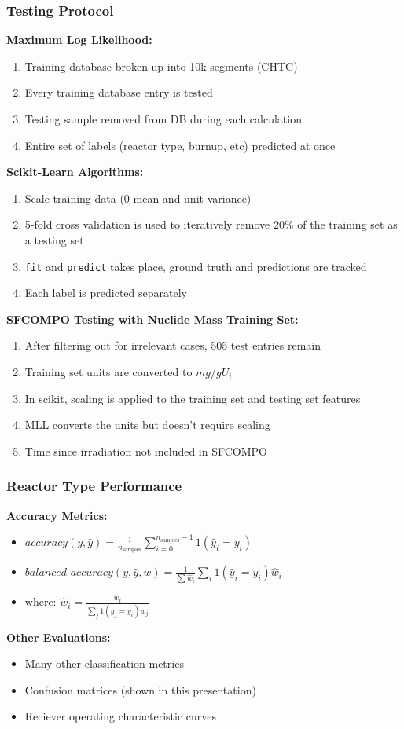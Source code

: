 
\begin{frame}
  \frametitle{Testing Protocol}
  \textbf{Maximum Log Likelihood:}
  \begin{enumerate}
    \footnotesize
    \item Training database broken up into 10k segments (CHTC)
    \item Every training database entry is tested
    \item Testing sample removed from DB during each calculation
    \item Entire set of labels (reactor type, burnup, etc) predicted at once
  \end{enumerate}
  \textbf{Scikit-Learn Algorithms:}
  \begin{enumerate}
    \footnotesize
    \item Scale training data ($0$ mean and unit variance)
    \item 5-fold cross validation is used to iteratively remove 20\% of the training set as a testing set
    \item \texttt{fit} and \texttt{predict} takes place, ground truth and predictions are tracked
    \item Each label is predicted separately
  \end{enumerate}
  \textbf{SFCOMPO Testing with Nuclide Mass Training Set:}
  \begin{enumerate}
    \footnotesize
    \item After filtering out for irrelevant cases, 505 test entries remain
    \item Training set units are converted to $mg/gU_i$
    \item In scikit, scaling is applied to the training set and testing set features
    \item MLL converts the units but doesn't require scaling
    \item Time since irradiation not included in SFCOMPO
  \end{enumerate}
\end{frame}

\begin{frame}
  \frametitle{Reactor Type Performance}
  \textbf{Accuracy Metrics:} \cite{scikit}
  \begin{itemize}
    \item $\textit{accuracy}(y, \hat{y}) = \frac{1}{n_\text{samples}} \sum_{i=0}^{n_\text{samples}-1} 1(\hat{y}_i = y_i)$
    \item $\textit{balanced-accuracy}(y, \hat{y}, w) = \frac{1}{\sum{\hat{w}_i}} \sum_i 1(\hat{y}_i = y_i) \hat{w}_i$
    \item $\text{where: } \hat{w}_i = \frac{w_i}{\sum_j{1(y_j = y_i) w_j}}$
  \end{itemize}
  \textbf{Other Evaluations:}
  \begin{itemize}
    \item Many other classification metrics 
    \item Confusion matrices (shown in this presentation)
    \item Reciever operating characteristic curves
  \end{itemize}
\end{frame}

